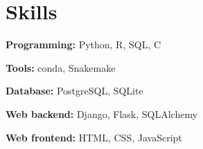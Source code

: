 \section{Skills}
\vspace{-0.5\baselineskip}
\begin{multicols}{2}
\begin{denseouterlist}
\item \textbf{Programming:} Python, R, SQL, C
\item \textbf{Tools:} conda, Snakemake
\item \textbf{Database:} PostgreSQL, SQLite
\item \textbf{Web backend:} Django, Flask, SQLAlchemy
\item \textbf{Web frontend:} HTML, CSS, JavaScript
\end{denseouterlist}
\end{multicols}
